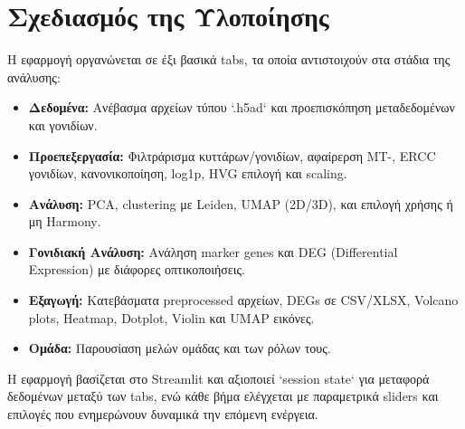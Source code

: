 \chapter{Σχεδιασμός της Υλοποίησης}

Η εφαρμογή οργανώνεται σε έξι βασικά \foreignlanguage{english}{tabs}, τα οποία αντιστοιχούν στα στάδια της ανάλυσης:

\begin{itemize}
  \item \textbf{Δεδομένα:} Ανέβασμα αρχείων τύπου \foreignlanguage{english}{`.h5ad`} και προεπισκόπηση μεταδεδομένων και γονιδίων.
  \item \textbf{Προεπεξεργασία:} Φιλτράρισμα κυττάρων/γονιδίων, αφαίρερση \foreignlanguage{english}{MT-, ERCC} γονιδίων, κανονικοποίηση, \foreignlanguage{english}{log1p, HVG} επιλογή και \foreignlanguage{english}{scaling}.
  \item \textbf{Ανάλυση:} \foreignlanguage{english}{PCA, clustering} με \foreignlanguage{english}{Leiden, UMAP (2D/3D)}, και επιλογή χρήσης ή μη \foreignlanguage{english}{Harmony}.
  \item \textbf{Γονιδιακή Ανάλυση:} Ανάληση \foreignlanguage{english}{marker genes} και \foreignlanguage{english}{DEG (Differential Expression)} με διάφορες οπτικοποιήσεις.
  \item \textbf{Εξαγωγή:} Κατεβάσματα \foreignlanguage{english}{preprocessed} αρχείων, \foreignlanguage{english}{DEGs} σε \foreignlanguage{english}{CSV/XLSX}, \foreignlanguage{english}{Volcano plots, Heatmap, Dotplot, Violin} και \foreignlanguage{english}{UMAP} εικόνες.
  \item \textbf{Ομάδα:} Παρουσίαση μελών ομάδας και των ρόλων τους.
\end{itemize}

Η εφαρμογή βασίζεται στο \foreignlanguage{english}{Streamlit} και αξιοποιεί \foreignlanguage{english}{`session state`} για μεταφορά δεδομένων μεταξύ των \foreignlanguage{english}{tabs}, ενώ κάθε βήμα ελέγχεται με παραμετρικά \foreignlanguage{english}{sliders} και επιλογές που ενημερώνουν δυναμικά την επόμενη ενέργεια.